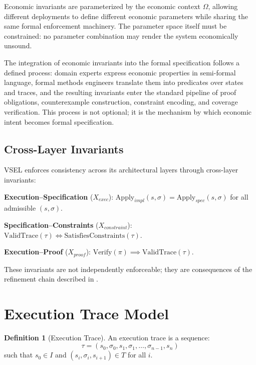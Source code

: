 \documentclass[11pt,a4paper]{article}
\theoremstyle{definition}
\newtheorem{definition}{Definition}[section]
\newcommand{\Apply}{\mathrm{Apply}}
\newcommand{\Verify}{\mathrm{Verify}}
\newcommand{\ValidTrace}{\mathrm{ValidTrace}}
\newcommand{\SatisfiesConstraints}{\mathrm{SatisfiesConstraints}}
\begin{document}
Economic invariants are parameterized by the economic context $\Omega$, allowing different deployments to define different economic parameters while sharing the same formal enforcement machinery. The parameter space itself must be constrained: no parameter combination may render the system economically unsound.

The integration of economic invariants into the formal specification follows a defined process: domain experts express economic properties in semi-formal language, formal methods engineers translate them into predicates over states and traces, and the resulting invariants enter the standard pipeline of proof obligations, counterexample construction, constraint encoding, and coverage verification. This process is not optional; it is the mechanism by which economic intent becomes formal specification.

\subsection{Cross-Layer Invariants}
\label{subsec:cross-layer}

VSEL enforces consistency across its architectural layers through cross-layer invariants:

\noindent\textbf{Execution--Specification} ($X_{\mathit{exec}}$): $\Apply_{\mathit{impl}}(s, \sigma) = \Apply_{\mathit{spec}}(s, \sigma)$ for all admissible $(s, \sigma)$.

\noindent\textbf{Specification--Constraints} ($X_{\mathit{constraint}}$): $\ValidTrace(\tau) \iff \SatisfiesConstraints(\tau)$.

\noindent\textbf{Execution--Proof} ($X_{\mathit{proof}}$): $\Verify(\pi) \implies \ValidTrace(\tau)$.

These invariants are not independently enforceable; they are consequences of the refinement chain described in .

\section{Execution Trace Model}
\label{sec:trace-model}

\begin{definition}[Execution Trace]
\label{def:execution-trace}
An execution trace is a sequence:
\begin{equation}
\tau = (s_0, \sigma_0, s_1, \sigma_1, \ldots, \sigma_{n-1}, s_n)
\end{equation}
such that $s_0 \in I$ and $(s_i, \sigma_i, s_{i+1}) \in T$ for all $i$.
\end{definition}
\end{document}
